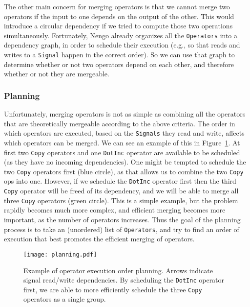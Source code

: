 \documentclass{article}
\begin{document}
The other main concern for merging operators is that we cannot merge two operators if the input to one depends on the output of the other.  This would introduce a circular dependency if we tried to compute those two operations simultaneously.  Fortunately, Nengo already organizes all the \texttt{Operators} into a dependency graph, in order to schedule their execution (e.g., so that reads and writes to a \texttt{Signal} happen in the correct order).  So we can use that graph to determine whether or not two operators depend on each other, and therefore whether or not they are mergeable.

\subsubsection{Planning}

Unfortunately, merging operators is not as simple as combining all the operators that are theoretically mergeable according to the above criteria.  The order in which operators are executed, based on the \texttt{Signals} they read and write, affects which operators can be merged.  We can see an example of this in Figure~\ref{fig:planning}.  At first two \texttt{Copy} operators and one \texttt{DotInc} operator are available to be scheduled (as they have no incoming dependencies).  One might be tempted to schedule the two \texttt{Copy} operators first (blue circle), as that allows us to combine the two \texttt{Copy} ops into one.  However, if we schedule the \texttt{DotInc} operator first then the third \texttt{Copy} operator will be freed of its dependency, and we will be able to merge all three \texttt{Copy} operators (green circle).  This is a simple example, but the problem rapidly becomes much more complex, and efficient merging becomes more important, as the number of operators increases.  Thus the goal of the planning process is to take an (unordered) list of \texttt{Operators}, and try to find an order of execution that best promotes the efficient merging of operators.

\begin{figure}
\centering
\texttt{[image: planning.pdf]}
\caption{Example of operator execution order planning.  Arrows indicate signal read/write dependencies.  By scheduling the \texttt{DotInc} operator first, we are able to more efficiently schedule the three \texttt{Copy} operators as a single group.}
\label{fig:planning}
\end{figure}
\end{document}

